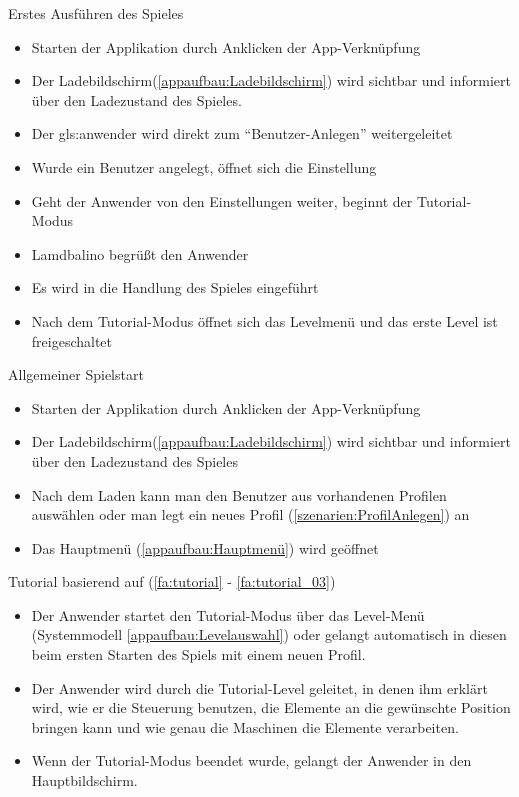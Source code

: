 \documentclass{scrartcl}
\begin{document}
\begin{telist}
	\item{Erstes Ausführen des Spieles} \label{szenarien:first_run}
	\begin{itemize}
		\item Starten der Applikation durch Anklicken der App-Verknüpfung
		\item Der Ladebildschirm(\ref{appaufbau:Ladebildschirm}) wird sichtbar und informiert über den Ladezustand des Spieles.
		\item Der \gls{gls:anwender} wird direkt zum "`Benutzer-Anlegen"'  weitergeleitet
		\item Wurde ein Benutzer angelegt, öffnet sich die Einstellung
		\item Geht der Anwender von den Einstellungen weiter, beginnt der Tutorial-Modus
		\item Lamdbalino begrüßt den Anwender
		\item Es wird in die Handlung des Spieles eingeführt
		\item Nach dem Tutorial-Modus öffnet sich das Levelmenü und das erste Level ist freigeschaltet 
	\end{itemize}
	
	\item{Allgemeiner Spielstart} \label{szenarien:allg_spielstart}
	\begin{itemize}
		\item Starten der Applikation durch Anklicken der App-Verknüpfung
		\item Der Ladebildschirm(\ref{appaufbau:Ladebildschirm}) wird sichtbar und informiert über den Ladezustand des Spieles
		\item Nach dem Laden kann man den Benutzer aus vorhandenen Profilen auswählen oder man legt ein neues Profil (\ref{szenarien:ProfilAnlegen}) an
		\item Das Hauptmenü (\ref{appaufbau:Hauptmenü}) wird geöffnet		
	\end{itemize}
	
	\item Tutorial basierend auf (\ref{fa:tutorial} - \ref{fa:tutorial_03})
	\begin{itemize}
		\item Der Anwender startet den Tutorial-Modus über das Level-Menü (Systemmodell \ref{appaufbau:Levelauswahl}) oder gelangt automatisch in diesen beim ersten Starten des Spiels mit einem neuen Profil.
		\item Der Anwender wird durch die Tutorial-Level geleitet, in denen ihm erklärt wird, wie er die Steuerung benutzen, die Elemente an die gewünschte Position bringen kann und wie genau die Maschinen die Elemente verarbeiten.
		\item Wenn der Tutorial-Modus beendet wurde, gelangt der Anwender in den Hauptbildschirm.
	\end{itemize}


\end{telist}
\end{document}
